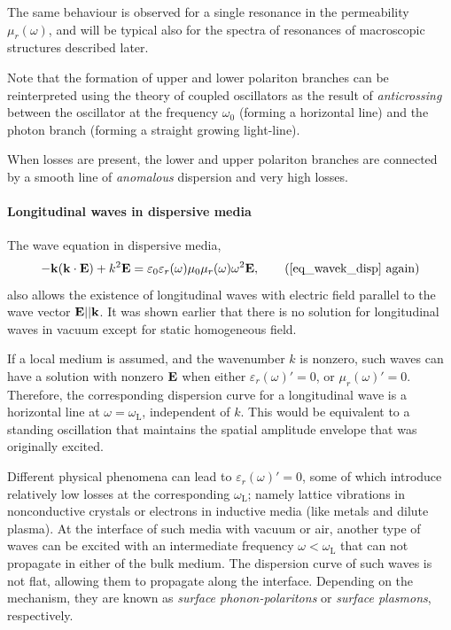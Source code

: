 The same behaviour is observed for a single resonance in the permeability $\mu_r(\omega)$, and will be typical also for the spectra of resonances of macroscopic structures described later.

Note that the formation of upper and lower polariton branches can be reinterpreted\cite{landau1984electrodynamics} using the theory of coupled oscillators as the result of \textit{anticrossing} between the oscillator at the frequency $\omega_0$ (forming a horizontal line) and the photon branch (forming a straight growing light-line).

When losses are present, the lower and upper polariton branches are connected by a smooth line of \textit{anomalous} dispersion and very high losses.  %
\paragraph{Longitudinal waves in dispersive media} %
The wave equation in dispersive media, 
\begin{equation} - \kk (\kk \cdot \E) + k^2 \E = \varepsilon_0 \epsrl(\omega) \mu_0 \murl(\omega) \omega^{2} \E, \tag{\ref{eq_wavek_disp} \again} \end{equation}
also allows the existence of longitudinal waves with electric field parallel to the wave vector $\mathbf{E} || {\mathbf{k}}$. It was shown earlier that there is no solution for longitudinal waves in vacuum except for static homogeneous field.

If a local medium is assumed, and the wavenumber $k$ is nonzero, such waves can have a solution with nonzero $\mathbf{E}$ when either $\varepsilon_r(\omega)' = 0$, or $\mu_r(\omega)' = 0$. Therefore, the corresponding dispersion curve for a longitudinal wave is a horizontal line at $\omega = \omega_{\text{L}}$, independent of $k$. This would be equivalent to a standing oscillation that maintains the spatial amplitude envelope that was originally excited. 

Different physical phenomena can lead to $\varepsilon_r(\omega)' = 0$, some of which introduce relatively low losses at the corresponding $\omega_{\text{L}}$; namely lattice vibrations in nonconductive crystals or electrons in inductive media (like metals and dilute plasma). At the interface of such media with vacuum or air, another type of waves can be excited with an intermediate frequency $\omega < \omega_{\text{L}}$ that can not propagate in either of the bulk medium. The dispersion curve of such waves is not flat, allowing them to propagate along the interface.
Depending on the mechanism, they are known as \textit{surface phonon-polaritons} or \textit{surface plasmons}, respectively. 
